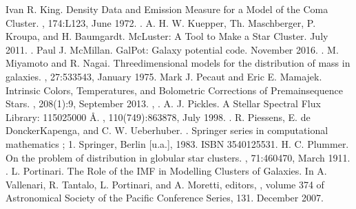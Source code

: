 \documentclass[letterpaper,10pt,english]{sphinxmanual}
\begin{document}
\begin{sphinxthebibliography}{10}
\sphinxAtStartPar
Ivan R. King. Density Data and Emission Measure for a Model of the Coma Cluster. , 174:L123, June 1972. .
\sphinxAtStartPar
A. H. W. Kuepper, Th. Maschberger, P. Kroupa, and H. Baumgardt. McLuster: A Tool to Make a Star Cluster. July 2011. .
\sphinxAtStartPar
Paul J. McMillan. GalPot: Galaxy potential code. November 2016. .
\sphinxAtStartPar
M. Miyamoto and R. Nagai. Three\sphinxhyphen{}dimensional models for the distribution of mass in galaxies. , 27:533\textendash{}543, January 1975.
\sphinxAtStartPar
Mark J. Pecaut and Eric E. Mamajek. Intrinsic Colors, Temperatures, and Bolometric Corrections of Pre\sphinxhyphen{}main\sphinxhyphen{}sequence Stars. , 208(1):9, September 2013. , .
\sphinxAtStartPar
A. J. Pickles. A Stellar Spectral Flux Library: 1150\sphinxhyphen{}25000 Å. , 110(749):863\textendash{}878, July 1998. .
\sphinxAtStartPar
R. Piessens, E. de Doncker\sphinxhyphen{}Kapenga, and C. W. Ueberhuber. . Springer series in computational mathematics ; 1. Springer, Berlin {[}u.a.{]}, 1983. ISBN 3540125531.
\sphinxAtStartPar
H. C. Plummer. On the problem of distribution in globular star clusters. , 71:460\textendash{}470, March 1911. .
\sphinxAtStartPar
L. Portinari. The Role of the IMF in Modelling Clusters of Galaxies. In A. Vallenari, R. Tantalo, L. Portinari, and A. Moretti, editors, , volume 374 of Astronomical Society of the Pacific Conference Series, 131. December 2007.

\end{sphinxthebibliography}
\end{document}
